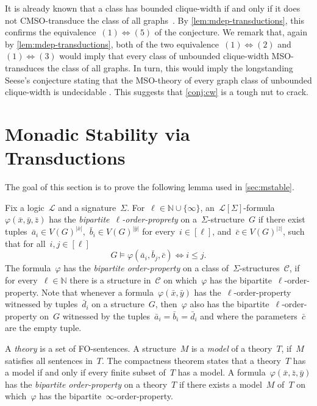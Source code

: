 \documentclass[11pt]{article}      \usepackage[margin=1in]{geometry}  \usepackage{microtype}
\theoremstyle{definition}
\newcommand{\N}[0]{\mathrm{\mathbb{N}}}
\renewcommand{\phi}{\varphi}
\newcommand{\LL}{\mathcal{L}}
\newcommand{\CC}{\mathcal{C}}
\renewcommand{\le}{\leqslant}
\renewcommand{\leq}{\le}
\begin{document}
It is already known that a class has bounded clique-width if and only if it does not CMSO-transduce the class of all graphs~\cite{COURCELLE200791}.
By \cref{lem:mdep-transductions}, this confirms the equivalence~$(1)\Leftrightarrow(5)$ of the conjecture.
We remark that, again by \cref{lem:mdep-transductions}, both of the two equivalence~$(1)\Leftrightarrow (2)$ and~$(1)\Leftrightarrow (3)$ would imply that every class of unbounded clique-width MSO-transduces the class of all graphs.
In turn, this would imply the longstanding Seese's conjecture stating that the MSO-theory of every graph class of unbounded clique-width is undecidable \cite{seese1991conjecture, courcelle2012graph}.
This suggests that \cref{conj:cw} is a tough nut to crack. 



\newpage
\appendix

\section{Monadic Stability via Transductions}

\newcommand{\Th}{\mathrm{Th}}

The goal of this section is to prove the following lemma used in \cref{sec:mstable}.

\lemMstableTransductions*

Fix a logic~$\LL$ and a signature~$\Sigma$.
For~$\ell\in \N\cup\{\infty\}$, an~$\LL[\Sigma]$-formula~$\phi(\bar x,\bar y, \bar z)$ has the \emph{bipartite~$\ell$-order-proprety} on a~$\Sigma$-structure~$G$ if there exist tuples~$\bar a_i \in V(G)^{|\bar x|}$,~$\bar b_i \in V(G)^{|\bar y|}$ for every~$i \in [\ell]$, and~$\bar c \in V(G)^{|\bar z|}$, such that for all~$i,j \in [\ell]$
\[
    G \models \phi(\bar a_i, \bar b_j, \bar c) \Leftrightarrow i \leq j.
\]
The formula~$\phi$ has the \emph{bipartite order-property} on a class of~$\Sigma$-structures~$\CC$, if for every~$\ell\in\N$ there is a structure in~$\CC$ on which~$\phi$ has the bipartite~$\ell$-order-property.
Note that whenever a formula~$\phi(\bar x, \bar y)$ has the~$\ell$-order-property witnessed by tuples~$\bar d_i$ on a structure~$G$, then~$\phi$ also has the bipartite~$\ell$-order-property on~$G$ witnessed by the tuples~$\bar a_i = \bar b_i = \bar d_i$ and where the parameters~$\bar c$ are the empty tuple.


A \emph{theory} is a set of FO-sentences.
A structure~$M$ is a \emph{model} of a theory~$T$, if~$M$ satisfies all sentences in~$T$.
The compactness theorem states that a theory~$T$ has a model if and only if every finite subset of~$T$ has a model.
A formula~$\phi(\bar x, \bar z, \bar y)$ has the \emph{bipartite order-property} on a theory~$T$ if there exists a model~$M$ of~$T$ on which~$\phi$ has the bipartite~$\infty$-order-property.
\end{document}
